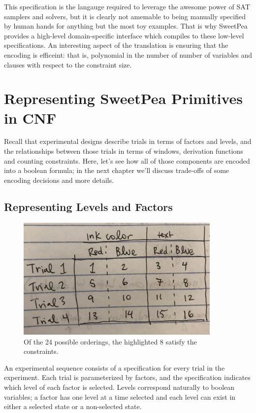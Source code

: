 This specification is the langauge required to leverage the awesome power of SAT samplers and solvers, but it is clearly not amemable to being manually specified by human hands for anything but the most toy examples. That is why SweetPea provides a high-level domain-specific interface which compiles to these low-level specifications. An interesting aspect of the translation is ensuring that the encoding is efficeint: that is, polynomial in the number of number of variables and clauses with respect to the constraint size.

\section{Representing SweetPea Primitives in CNF}

Recall that experimental designs describe trials in terms of factors and levels, and the relationships between those trials in terms of windows, derivation functions and counting constraints. Here, let's see how all of those components are encoded into a boolean formula; in the next chapter we'll discuss trade-offs of some encoding decisions and more details.

\subsection{Representing Levels and Factors}

\begin{figure}[t]
    \centerline{\includegraphics[origin=c,width=10cm]{encoding_strupe_vars}}
    \caption{Of the 24 possible orderings, the highlighted 8 satisfy the constraints.}%
    \label{fig:encoding_strupe_vars}%
\end{figure}

An experimental sequence consists of a specification for every trial in the experiment. Each trial is parameterized by factors, and the specification indicates which level of each factor is selected. Levels correspond naturally to boolean variables; a factor has one level at a time selected and each level can exist in either a selected state or a non-selected state.

